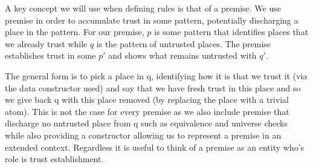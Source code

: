 A key concept we will use when defining rules is that of a premise. We use
premise in order to accumulate trust in some pattern, potentially discharging
a place in the pattern. For our premise, $p$ is some pattern that identifies places
that we already trust while $q$ is the pattern of untrusted places. The premise
establishes trust in some $p'$ and shows what remains untrusted with $q'$.

The general form is to pick a place in q, identifying how it is that we trust it
(via the data constructor used) and say that we have fresh trust in this place and so
we give back q with this place removed (by replacing the place with a trivial atom).
This is not the case for every premise as we also include premise that discharge no
untrusted place from q such as equivalence and universe checks while also providing
a constructor allowing us to represent a premise in an extended context. Regardless
it is useful to think of a premise as an entity who's role is trust establishment.

